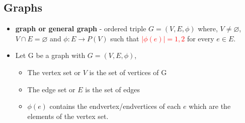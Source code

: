 \subsection{Graphs}
\begin{itemize}
 \item \textbf{graph or general graph} - ordered triple $G=(V,E,\phi)$ where, $V\neq\varnothing$, $V \cap E = \varnothing$ and $\phi:E \rightarrow P(V)$ such that \textcolor{red}{$|\phi(e)|={1,2}$} for every $e \in E$.
 \item Let G be a graph with $G = (V,E,\phi)$,
	\begin{itemize}
		\item The vertex set or $V$ is the set of vertices of G
		\item The edge set or $E$ is the set of edges
		\item $\phi(e)$ contains the endvertex/endvertices of each $e$ which are the elements of the vertex set. 
	\end{itemize}	 
\begin{figure}[h!]
\centering
{}
\end{figure}
\end{itemize}
